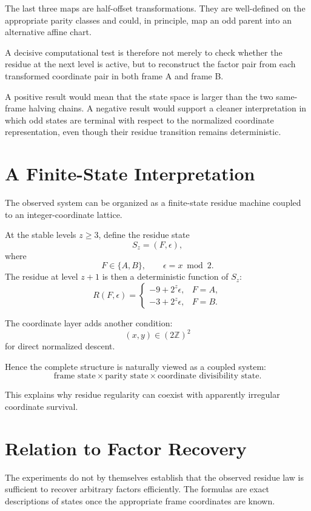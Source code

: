 \documentclass[11pt,a4paper]{article}
\theoremstyle{definition}
\theoremstyle{remark}
\newcommand{\Z}{\mathbb Z}
\begin{document}
The last three maps are half-offset transformations. They are well-defined on the appropriate parity classes and could, in principle, map an odd parent into an alternative affine chart.

A decisive computational test is therefore not merely to check whether the residue at the next level is active, but to reconstruct the factor pair from each transformed coordinate pair in both frame A and frame B.

A positive result would mean that the state space is larger than the two same-frame halving chains. A negative result would support a cleaner interpretation in which odd states are terminal with respect to the normalized coordinate representation, even though their residue transition remains deterministic.

\section{A Finite-State Interpretation}

The observed system can be organized as a finite-state residue machine coupled to an integer-coordinate lattice.

At the stable levels $z\ge3$, define the residue state
\[
S_z=(F,\epsilon),
\]
where
\[
F\in\{A,B\},
\qquad
\epsilon=x\bmod2.
\]
The residue at level $z+1$ is then a deterministic function of $S_z$:
\begin{equation}
R(F,\epsilon)=
\begin{cases}
-9+2^z\epsilon,&F=A,\\
-3+2^z\epsilon,&F=B.
\end{cases}
\end{equation}

The coordinate layer adds another condition:
\[
(x,y)\in(2\Z)^2
\]
for direct normalized descent.

Hence the complete structure is naturally viewed as a coupled system:
\[
\text{frame state}
\times
\text{parity state}
\times
\text{coordinate divisibility state}.
\]

This explains why residue regularity can coexist with apparently irregular coordinate survival.

\section{Relation to Factor Recovery}

The experiments do not by themselves establish that the observed residue law is sufficient to recover arbitrary factors efficiently. The formulas are exact descriptions of states once the appropriate frame coordinates are known.
\end{document}

